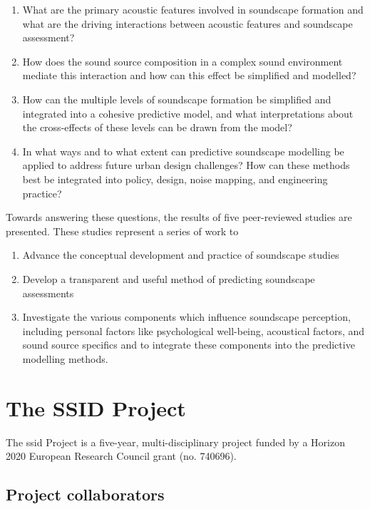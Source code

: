 \begin{enumerate}
  \item What are the primary acoustic features involved in soundscape formation and what are the driving interactions between acoustic features and soundscape assessment?
  \item How does the sound source composition in a complex sound environment mediate this interaction and how can this effect be simplified and modelled?
  \item How can the multiple levels of soundscape formation be simplified and integrated into a cohesive predictive model, and what interpretations about the cross-effects of these levels can be drawn from the model?
  \item In what ways and to what extent can predictive soundscape modelling be applied to address future urban design challenges? How can these methods best be integrated into policy, design, noise mapping, and engineering practice?
\end{enumerate}

Towards answering these questions, the results of five %
peer-reviewed studies are presented. These studies represent a series of work to 

\begin{enumerate}
  \item Advance the conceptual development and practice of soundscape studies
  \item Develop a transparent and useful method of predicting soundscape assessments
  \item Investigate the various components which influence soundscape perception, including personal factors like psychological well-being, acoustical factors, and sound source specifics and to integrate these components into the predictive modelling methods.
\end{enumerate}

\section{The SSID Project}
The \gls{ssid} Project is a five-year, multi-disciplinary project funded by a Horizon 2020 European Research Council grant (no. 740696).

\subsection{Project collaborators}

